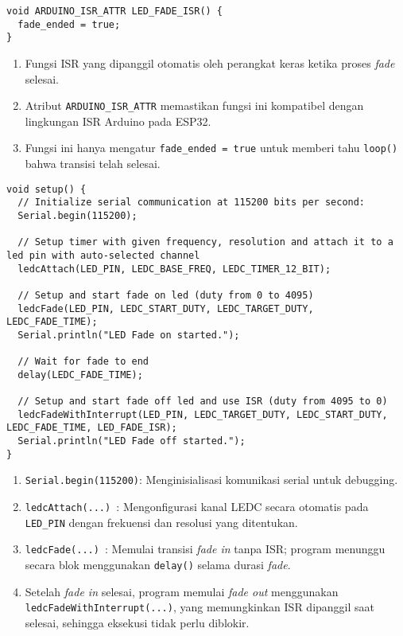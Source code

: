 \begin{verbatim}
void ARDUINO_ISR_ATTR LED_FADE_ISR() {
  fade_ended = true;
}
\end{verbatim}
\begin{enumerate}
    \item Fungsi ISR yang dipanggil otomatis oleh perangkat keras ketika proses \textit{fade} selesai.
    \item Atribut \texttt{ARDUINO\_ISR\_ATTR} memastikan fungsi ini kompatibel dengan lingkungan ISR Arduino pada ESP32.
    \item Fungsi ini hanya mengatur \texttt{fade\_ended = true} untuk memberi tahu \texttt{loop()} bahwa transisi telah selesai.
\end{enumerate}

\begin{verbatim}
void setup() {
  // Initialize serial communication at 115200 bits per second:
  Serial.begin(115200);

  // Setup timer with given frequency, resolution and attach it to a led pin with auto-selected channel
  ledcAttach(LED_PIN, LEDC_BASE_FREQ, LEDC_TIMER_12_BIT);

  // Setup and start fade on led (duty from 0 to 4095)
  ledcFade(LED_PIN, LEDC_START_DUTY, LEDC_TARGET_DUTY, LEDC_FADE_TIME);
  Serial.println("LED Fade on started.");

  // Wait for fade to end
  delay(LEDC_FADE_TIME);

  // Setup and start fade off led and use ISR (duty from 4095 to 0)
  ledcFadeWithInterrupt(LED_PIN, LEDC_TARGET_DUTY, LEDC_START_DUTY, LEDC_FADE_TIME, LED_FADE_ISR);
  Serial.println("LED Fade off started.");
}
\end{verbatim}
\begin{enumerate}
    \item \texttt{Serial.begin(115200)}: Menginisialisasi komunikasi serial untuk debugging.
    \item \texttt{ledcAttach(...) }: Mengonfigurasi kanal LEDC secara otomatis pada \texttt{LED\_PIN} dengan frekuensi dan resolusi yang ditentukan.
    \item \texttt{ledcFade(...) }: Memulai transisi \textit{fade in} tanpa ISR; program menunggu secara blok menggunakan \texttt{delay()} selama durasi \textit{fade}.
    \item Setelah \textit{fade in} selesai, program memulai \textit{fade out} menggunakan \texttt{ledcFadeWithInterrupt(...)}, yang memungkinkan ISR dipanggil saat selesai, sehingga eksekusi tidak perlu diblokir.
\end{enumerate}

